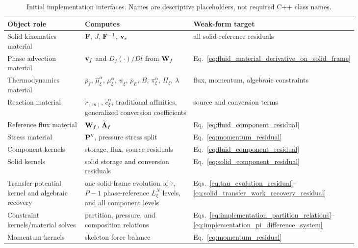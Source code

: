 \begin{table}[h]
	\centering
	\caption{Initial implementation interfaces.  Names are descriptive
	placeholders, not required C++ class names.}
	\label{tab:implementation_interfaces}
	\small
	\begin{tabular}{p{0.23\linewidth}p{0.34\linewidth}p{0.26\linewidth}}
		\toprule
		Object role & Computes & Weak-form target \\
		\midrule
		Solid kinematics material & \(\mathbf{F}\), \(J\), \(\mathbf{F}^{-1}\), \(\mathbf{v}_s\) & all solid-reference residuals \\
		Phase advection material & \(\mathbf{v}_f\) and \(D_f(\cdot)/Dt\) from \(\mathbf{W}_f\) & Eq.~\eqref{eq:fluid_material_derivative_on_solid_frame} \\
		Thermodynamics material & \(\bar p_f\), \(\hat\mu_\xi^\alpha\), \(\mu_\xi^\alpha\), \(\psi_\xi\), \(\bar p_E\), \(B\), \(\pi_\xi^\alpha\), \(\Pi_\xi\), \(\lambda\) & flux, momentum, algebraic constraints \\
		Reaction material & \(\dot r_{(m)}\), \(\dot c_\xi^\alpha\), traditional affinities, generalized conversion coefficients & source and conversion terms \\
		Reference flux material & \(\mathbf{W}_f\), \(\widetilde{\boldsymbol{\Lambda}}_f\) & Eq.~\eqref{eq:fluid_component_residual} \\
		Stress material & \(\mathbf{P}^{\prime\prime}\), pressure stress split & Eq.~\eqref{eq:momentum_residual} \\
		Component kernels & storage, flux, source residuals & Eq.~\eqref{eq:fluid_component_residual} \\
		Solid kernels & solid storage and conversion residuals & Eq.~\eqref{eq:solid_component_residual} \\
		Transfer-potential kernel and algebraic recovery & one solid-frame evolution of \(\tau\), \(P-1\) phase-reference \(L_\xi^N\) levels, and all component levels & Eqs.~\eqref{eq:tau_evolution_residual}--\eqref{eq:solid_transfer_work_recovery_residual} \\
		Constraint kernels/material solves & partition, pressure, and composition relations & Eqs.~\eqref{eq:implementation_partition_relations}--\eqref{eq:implementation_pi_difference_system} \\
		Momentum kernels & skeleton force balance & Eq.~\eqref{eq:momentum_residual} \\
		\bottomrule
	\end{tabular}
\end{table}

